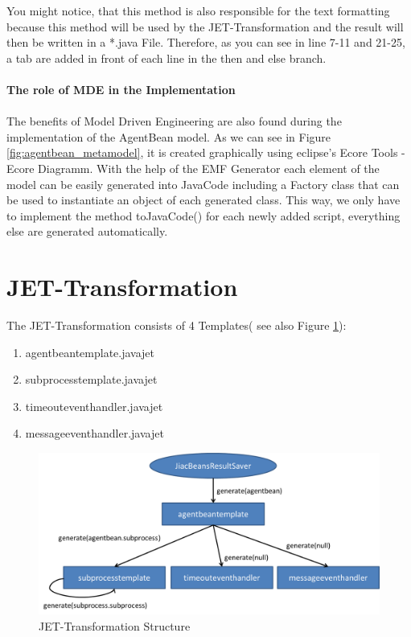 You might notice, that this method is also responsible for the text formatting because this method will be used by the JET-Transformation and the result will then be written in a *.java File. Therefore, as you can see in line 7-11 and 21-25, a tab are added in front of each line in the then and else branch.\\\\
\textbf{The role of MDE in the Implementation}\\\\
The benefits of Model Driven Engineering are also found during the implementation of the AgentBean model. As we can see in Figure \ref{fig:agentbean_metamodel}, it is created graphically using eclipse's Ecore Tools - Ecore Diagramm. With the help of the EMF Generator each element of the model can be easily generated into JavaCode including a Factory class that can be used to instantiate an object of each generated class. This way, we only have to implement the method toJavaCode() for each newly added script, everything else are generated automatically. 


\section{JET-Transformation}
The JET-Transformation consists of 4 Templates( see also Figure \ref{fig:transformation_structure}): 
\begin{enumerate}
	\item agentbeantemplate.javajet
	\item subprocesstemplate.javajet
	\item timeouteventhandler.javajet
	\item messageeventhandler.javajet
\end{enumerate}

\begin{figure}[h]
	\centering\includegraphics[width=1.0\textwidth]{images/templates_structure.png}
	\caption{JET-Transformation Structure}
	\label{fig:transformation_structure}
\end{figure}

